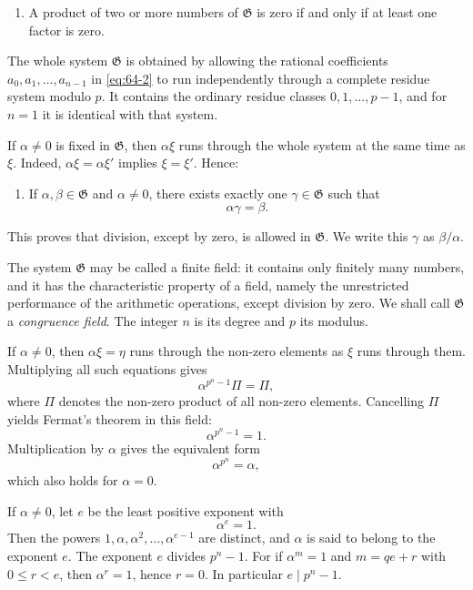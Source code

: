 \documentclass[11pt,a4paper]{article}
\begin{document}
\begin{enumerate}[label=\arabic*.,resume]
\item A product of two or more numbers of \(\mathfrak G\) is zero if and only if at least one factor is zero.
\end{enumerate}
The whole system \(\mathfrak G\) is obtained by allowing the rational coefficients \(a_0,a_1,\ldots,a_{n-1}\) in \eqref{eq:64-2} to run independently through a complete residue system modulo \(p\).  It contains the ordinary residue classes \(0,1,\ldots,p-1\), and for \(n=1\) it is identical with that system.

If \(\alpha\ne0\) is fixed in \(\mathfrak G\), then \(\alpha\xi\) runs through the whole system at the same time as \(\xi\).  Indeed, \(\alpha\xi=\alpha\xi'\) implies \(\xi=\xi'\).  Hence:

\begin{enumerate}[label=\arabic*.,resume]
\item If \(\alpha,\beta\in\mathfrak G\) and \(\alpha\ne0\), there exists exactly one \(\gamma\in\mathfrak G\) such that
\[
 \alpha\gamma=\beta.
\]
\end{enumerate}
This proves that division, except by zero, is allowed in \(\mathfrak G\).  We write this \(\gamma\) as \(\beta/\alpha\).

The system \(\mathfrak G\) may be called a finite field: it contains only finitely many numbers, and it has the characteristic property of a field, namely the unrestricted performance of the arithmetic operations, except division by zero.  We shall call \(\mathfrak G\) a \emph{congruence field}.  The integer \(n\) is its degree and \(p\) its modulus.

If \(\alpha\ne0\), then \(\alpha\xi=\eta\) runs through the non-zero elements as \(\xi\) runs through them.  Multiplying all such equations gives
\[
 \alpha^{p^n-1}\Pi=\Pi,
\]
where \(\Pi\) denotes the non-zero product of all non-zero elements.  Cancelling \(\Pi\) yields Fermat's theorem in this field:
\begin{equation}\label{eq:64-3}
 \alpha^{p^n-1}=1.
\end{equation}
Multiplication by \(\alpha\) gives the equivalent form
\begin{equation}\label{eq:64-4}
 \alpha^{p^n}=\alpha,
\end{equation}
which also holds for \(\alpha=0\).

If \(\alpha\ne0\), let \(e\) be the least positive exponent with
\begin{equation}\label{eq:64-5}
 \alpha^e=1.
\end{equation}
Then the powers \(1,\alpha,\alpha^2,\ldots,\alpha^{e-1}\) are distinct, and \(\alpha\) is said to belong to the exponent \(e\).  The exponent \(e\) divides \(p^n-1\).  For if \(\alpha^m=1\) and \(m=qe+r\) with \(0\le r<e\), then \(\alpha^r=1\), hence \(r=0\).  In particular \(e\mid p^n-1\).
\end{document}

